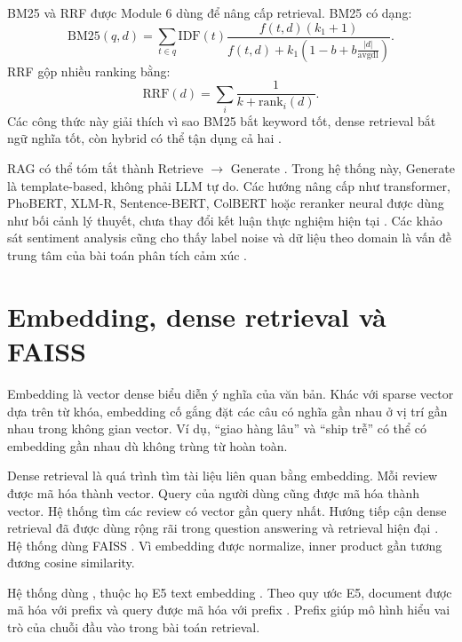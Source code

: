 BM25 và RRF được Module 6 dùng để nâng cấp retrieval. BM25 có dạng:
\begin{equation}
\mathrm{BM25}(q,d)=\sum_{t\in q}\mathrm{IDF}(t)\frac{f(t,d)(k_1+1)}{f(t,d)+k_1(1-b+b\frac{|d|}{\mathrm{avgdl}})}.
\end{equation}
RRF gộp nhiều ranking bằng:
\begin{equation}
\mathrm{RRF}(d)=\sum_i \frac{1}{k+\mathrm{rank}_i(d)}.
\end{equation}
Các công thức này giải thích vì sao BM25 bắt keyword tốt, dense retrieval bắt ngữ nghĩa tốt, còn hybrid có thể tận dụng cả hai \cite{robertson2009probabilistic,cormack2009rrf}.

RAG có thể tóm tắt thành Retrieve $\rightarrow$ Generate \cite{lewis2020rag}. Trong hệ thống này, Generate là template-based, không phải LLM tự do. Các hướng nâng cấp như transformer, PhoBERT, XLM-R, Sentence-BERT, ColBERT hoặc reranker neural được dùng như bối cảnh lý thuyết, chưa thay đổi kết luận thực nghiệm hiện tại \cite{devlin2019bert,vaswani2017attention,conneau2020xlmr,nguyen2020phobert,reimers2019sentencebert,nogueira2019passage,khattab2020colbert}. Các khảo sát sentiment analysis cũng cho thấy label noise và dữ liệu theo domain là vấn đề trung tâm của bài toán phân tích cảm xúc \cite{pang2008opinion,liu2012sentiment}.

\section{Embedding, dense retrieval và FAISS}
Embedding là vector dense biểu diễn ý nghĩa của văn bản. Khác với \TFIDF{} sparse vector dựa trên từ khóa, embedding cố gắng đặt các câu có nghĩa gần nhau ở vị trí gần nhau trong không gian vector. Ví dụ, “giao hàng lâu” và “ship trễ” có thể có embedding gần nhau dù không trùng từ hoàn toàn.

Dense retrieval là quá trình tìm tài liệu liên quan bằng embedding. Mỗi review được mã hóa thành vector. Query của người dùng cũng được mã hóa thành vector. Hệ thống tìm các review có vector gần query nhất. Hướng tiếp cận dense retrieval đã được dùng rộng rãi trong question answering và retrieval hiện đại \cite{karpukhin2020dense}. Hệ thống dùng FAISS  \cite{johnson2019billion}. Vì embedding được normalize, inner product gần tương đương cosine similarity.

Hệ thống dùng , thuộc họ E5 text embedding \cite{wang2022e5}. Theo quy ước E5, document được mã hóa với prefix  và query được mã hóa với prefix . Prefix giúp mô hình hiểu vai trò của chuỗi đầu vào trong bài toán retrieval.

